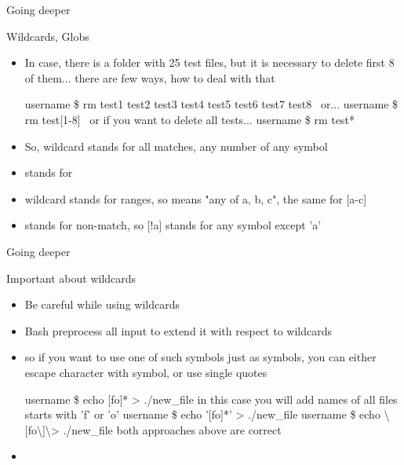 \documentclass[usenames,dvipsnames,10pt,aspectratio=169]{beamer}
\begin{document}
\begin{frame}{Going deeper}

    {\Large Wildcards, Globs}
    \begin{itemize}
        \item In case, there is a folder with 25 test files, but it is necessary to delete first 8 of them... there are few ways, how to deal with that
        \begin{examples}
        username \$ rm test1 test2 test3 test4 test5 test6 test7 test8 \newline
        \,\,\,or... \newline
        username \$ rm test[1-8] \newline
        \,\,\,or if you want to delete all tests... \newline
        username \$ rm test*
        \end{examples}
        \item So, \ex{*} wildcard stands for all matches, any number of any symbol
        \item {} stands for 
        \item \ex{[]} wildcard stands for ranges, so \ex{[abc]} means "any of a, b, c", the same for [a-c]
        \item \ex{!} stands for non-match, so [!a] stands for any symbol except 'a'
    \end{itemize}
\end{frame}

\begin{frame}{Going deeper}

    {\Large Important about wildcards}
    \begin{itemize}
        \item Be careful while using wildcards
        \item Bash preprocess all input to extend it with respect to wildcards
        \item so if you want to use one of such symbols just as symbols, you can either escape character with \ex{\textbackslash} symbol, or use single quotes
        \begin{examples}
        username \$ echo [fo]* > ./new\_file \newline in this case you will add names of all files starts with 'f' or 'o' \newline
        username \$ echo '[fo]*' > ./new\_file\newline
        username \$ echo \textbackslash [fo\textbackslash ]\textbackslash * > ./new\_file \newline
        both approaches above are correct
        \end{examples}
        \item {}
    \end{itemize}
\end{frame}
\end{document}
